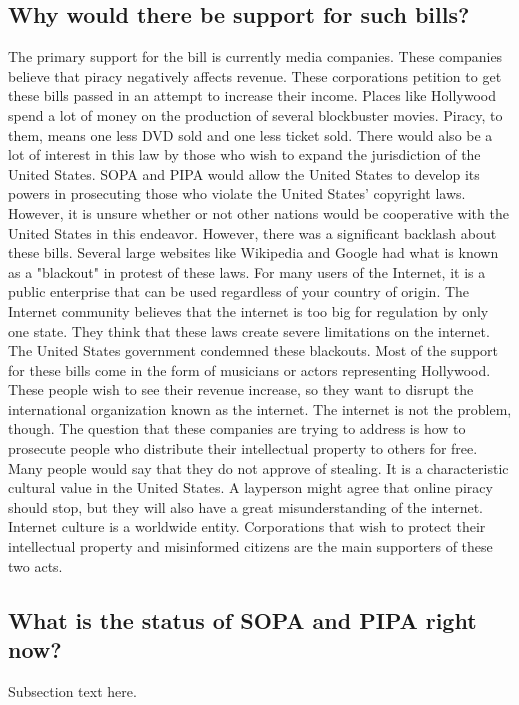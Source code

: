 \documentclass[11pt,journal,compsoc]{IEEEtran}
\begin{document}
\subsection{Why would there be support for such bills?}
The primary support for the bill is currently media companies. These companies believe that piracy negatively affects revenue. These corporations petition to get these bills passed in an attempt to increase their income. Places like Hollywood spend a lot of money on the production of several blockbuster movies. Piracy, to them, means one less DVD sold and one less ticket sold. There would also be a lot of interest in this law by those who wish to expand the jurisdiction of the United States. SOPA and PIPA would allow the United States to develop its powers in prosecuting those who violate the United States' copyright laws. However, it is unsure whether or not other nations would be cooperative with the United States in this endeavor. However, there was a significant backlash about these bills. Several large websites like Wikipedia and Google had what is known as a "blackout" in protest of these laws. For many users of the Internet, it is a public enterprise that can be used regardless of your country of origin. The Internet community believes that the internet is too big for regulation by only one state. They think that these laws create severe limitations on the internet. The United States government condemned these blackouts. Most of the support for these bills come in the form of musicians or actors representing Hollywood. These people wish to see their revenue increase, so they want to disrupt the international organization known as the internet. The internet is not the problem, though. The question that these companies are trying to address is how to prosecute people who distribute their intellectual property to others for free. Many people would say that they do not approve of stealing. It is a characteristic cultural value in the United States. A layperson might agree that online piracy should stop, but they will also have a great misunderstanding of the internet. Internet culture is a worldwide entity. Corporations that wish to protect their intellectual property and misinformed citizens are the main supporters of these two acts.

\subsection{What is the status of SOPA and PIPA right now?}
Subsection text here.
\end{document}
